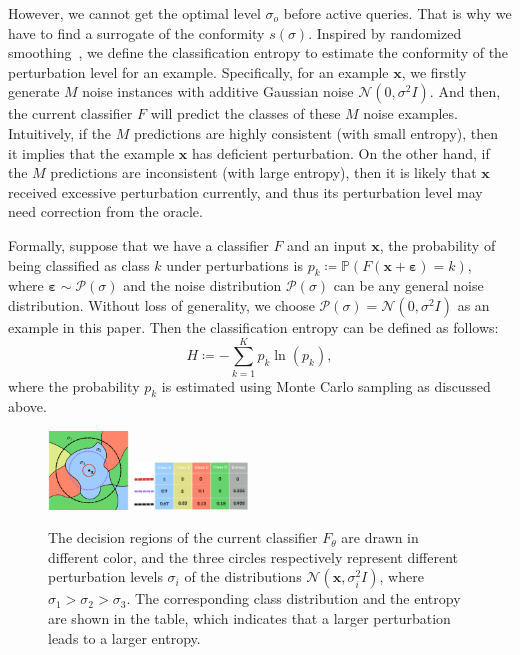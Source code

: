 \documentclass[letterpaper]{article} %
\begin{document}
However, we cannot get the optimal level $\sigma_o$ before active queries. That is why we have to find a surrogate of the conformity $s(\sigma)$.
Inspired by randomized smoothing~\cite{cohen2019certified}, we define the classification entropy to estimate the conformity of the perturbation level for an example. Specifically, for an example $\mathbf{x}$, we firstly generate $M$ noise instances with additive Gaussian noise $\mathcal{N}(0,\sigma^2 I)$. And then, the current classifier $F$ will predict the classes of these $M$ noise examples. Intuitively, if the $M$ predictions are highly consistent (with small entropy), then it implies that the example $\mathbf{x}$ has deficient perturbation. On the other hand, if the $M$ predictions are inconsistent (with large entropy), then it is likely that $\mathbf{x}$ received excessive perturbation currently, and thus its perturbation level may need correction from the oracle.

Formally, suppose that we have a classifier $F$ and an input $\mathbf{x}$, the probability of being classified as class $k$ under perturbations is $p_k \coloneqq \mathbb{P}(F(\mathbf{x}+\boldsymbol{\varepsilon})=k)$, where $\boldsymbol{\varepsilon} \sim \mathcal{P}(\sigma)$ and the noise distribution $\mathcal{P}(\sigma)$ can be any general noise distribution. Without loss of generality, we choose $\mathcal{P}(\sigma) = \mathcal{N}(0, \sigma^{2} I)$ as an example in this paper. Then the classification entropy can be defined as follows:
\begin{equation}\label{Eq:entropy}
H \coloneqq -\sum_{k=1}^{K} p_k \operatorname{ln}(p_k),
\end{equation}
where the probability $p_k$ is estimated using Monte Carlo sampling as discussed above.

\begin{figure}[t]
\begin{center}
\includegraphics[width=0.19\textwidth]{img/classificationEntropy-1.pdf}
\includegraphics[width=0.27\textwidth]{img/classificationEntropy2-1.jpg}
\end{center}
\caption{The decision regions of the current classifier $F_\theta$ are drawn in different color, and the three circles respectively represent different perturbation levels $\sigma_i$ of the distributions $\mathcal{N}(\mathbf{x}, \sigma_i^2I)$, where $\sigma_1 > \sigma_2 > \sigma_3$. The corresponding class distribution and the entropy are shown in the table, which indicates that a larger perturbation leads to a larger entropy.}
\label{fig:intuitionAndTheroy}
\end{figure}
\end{document}

